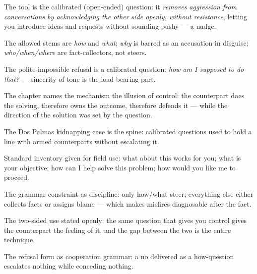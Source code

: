 

\begin{distilled}
  \item The tool is the calibrated (open-ended) question: it \emph{removes aggression from conversations by acknowledging the other side openly, without resistance}, letting you introduce ideas and requests without sounding pushy --- a nudge.
  \item The allowed stems are \emph{how} and \emph{what}; \emph{why} is barred as an accusation in disguise; \emph{who/when/where} are fact-collectors, not steers.
  \item The polite-impossible refusal is a calibrated question: \emph{how am I supposed to do that?} --- sincerity of tone is the load-bearing part.
  \item The chapter names the mechanism the illusion of control: the counterpart does the solving, therefore owns the outcome, therefore defends it --- while the direction of the solution was set by the question.
  \item The Dos Palmas kidnapping case is the spine: calibrated questions used to hold a line with armed counterparts without escalating it.
  \item Standard inventory given for field use: what about this works for you; what is your objective; how can I help solve this problem; how would you like me to proceed.
\end{distilled}

\begin{unique}
  \item The grammar constraint as discipline: only how/what steer; everything else either collects facts or assigns blame --- which makes misfires diagnosable after the fact.
  \item The two-sided use stated openly: the same question that gives you control gives the counterpart the feeling of it, and the gap between the two is the entire technique.
  \item The refusal form as cooperation grammar: a no delivered as a how-question escalates nothing while conceding nothing.
\end{unique}
